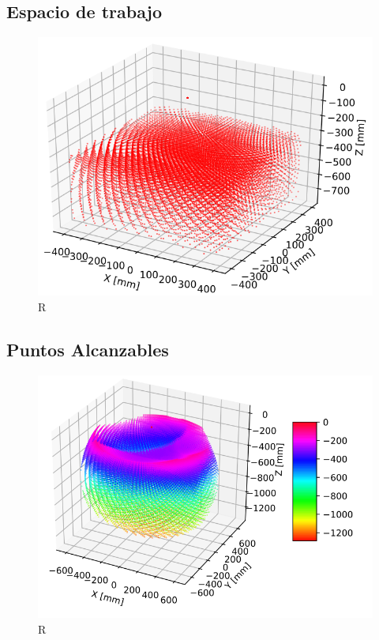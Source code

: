         \newpage

        \subsection{Espacio de trabajo}
        \begin{figure}[h]
            \centering
            \includegraphics[width=0.55\linewidth]{Main/Chapter7/Images7/ws_6.png}
            \caption{R}
            \label{f:cap7_ws6}
        \end{figure}
        
    \subsection{Puntos Alcanzables}
        \begin{figure}[h]
            \centering
            \includegraphics[width=0.82\linewidth]{Main/Chapter7/Images7/ws_1.png}
            \caption{R}
            \label{f:cap7_ws1}
        \end{figure}    
        
